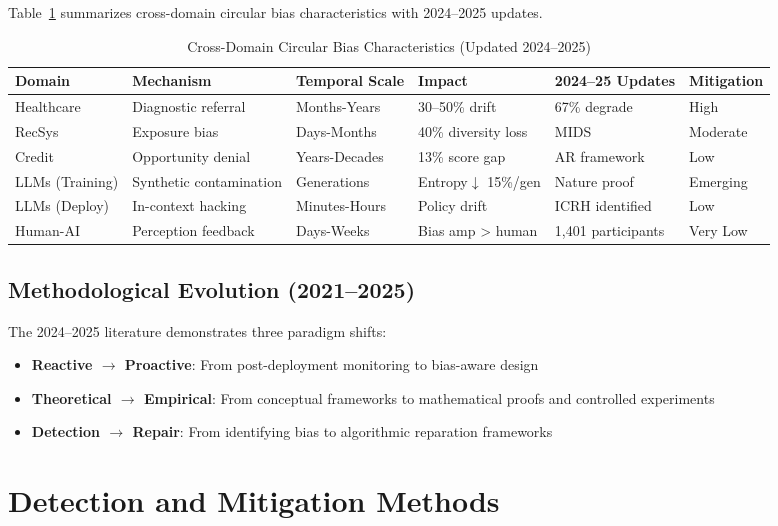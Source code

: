 \documentclass[11pt]{article}
\begin{document}
Table~\ref{tab:domains} summarizes cross-domain circular bias characteristics with 2024–2025 updates.

\begin{table}[ht]
\centering
\caption{Cross-Domain Circular Bias Characteristics (Updated 2024–2025)}
\label{tab:domains}
\small
\begin{tabular}{@{}lllllp{3cm}@{}}
\toprule
\textbf{Domain} & \textbf{Mechanism} & \textbf{Temporal Scale} & \textbf{Impact} & \textbf{2024–25 Updates} & \textbf{Mitigation} \\
\midrule
Healthcare & Diagnostic referral & Months-Years & 30–50\% drift & 67\% degrade\cite{nestor2024} & High \\
RecSys & Exposure bias & Days-Months & 40\% diversity loss & MIDS\cite{wyllie2024} & Moderate \\
Credit & Opportunity denial & Years-Decades & 13\% score gap & AR framework\cite{wyllie2024} & Low \\
LLMs (Training) & Synthetic contamination & Generations & Entropy$\downarrow$ 15\%/gen & Nature proof\cite{shumailov2024} & Emerging \\
LLMs (Deploy) & In-context hacking & Minutes-Hours & Policy drift\cite{pan2024} & ICRH identified & Low \\
Human-AI & Perception feedback & Days-Weeks & Bias amp > human\cite{glickman2024} & 1,401 participants & Very Low \\
\bottomrule
\end{tabular}
\end{table}

\subsection{Methodological Evolution (2021–2025)}

The 2024–2025 literature demonstrates three paradigm shifts:
\begin{itemize}
    \item \textbf{Reactive $\rightarrow$ Proactive}: From post-deployment monitoring to bias-aware design
    \item \textbf{Theoretical $\rightarrow$ Empirical}: From conceptual frameworks to mathematical proofs and controlled experiments
    \item \textbf{Detection $\rightarrow$ Repair}: From identifying bias to algorithmic reparation frameworks
\end{itemize}

\section{Detection and Mitigation Methods}
\end{document}
